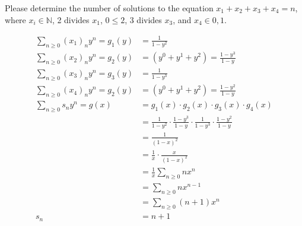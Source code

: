 Please determine the number of solutions to the equation $x_1 + x_2 + x_3 + x_4 = n$, where $x_i \in \mathbb{N}$, 2 divides $x_1$, $0\le2$, 3 divides $x_3$, and $x_4 \in {0,1}$.
\begin{framed}
	\begin{align*}
		\sum_{n\ge0}(x_1)_ny^n = g_1(y) &= \frac{1}{1-y^2}\\ 
		\sum_{n\ge0}(x_2)_ny^n = g_2(y) &= (y^0+y^1+y^2) = \frac{1-y^3}{1-y}\\
		\sum_{n\ge0}(x_3)_ny^n = g_3(y) &= \frac{1}{1-y^3}\\ 
		\sum_{n\ge0}(x_4)_ny^n = g_2(y) &= (y^0+y^1+y^2) = \frac{1-y^2}{1-y}\\
		\sum_{n\ge0}s_ny^n = g(x) &= g_1(x) \cdot g_2(x) \cdot g_3(x) \cdot g_4(x)\\
			 &= \frac{1}{1-y^2} \cdot \frac{1-y^3}{1-y} \cdot \frac{1}{1-y^3} \cdot \frac{1-y^2}{1-y}\\ 
			 &=\frac{1}{(1-x)^2}\\
			 &= \frac{1}{x} \cdot \frac{x}{(1-x)^2}\\
			 &= \frac{1}{x}\sum_{n\ge0}nx^n\\
			 &= \sum_{n\ge0}nx^{n-1}\\
			 &= \sum_{n\ge0}(n+1)x^n\\
		s_n &= n+1
	\end{align*}
\end{framed}